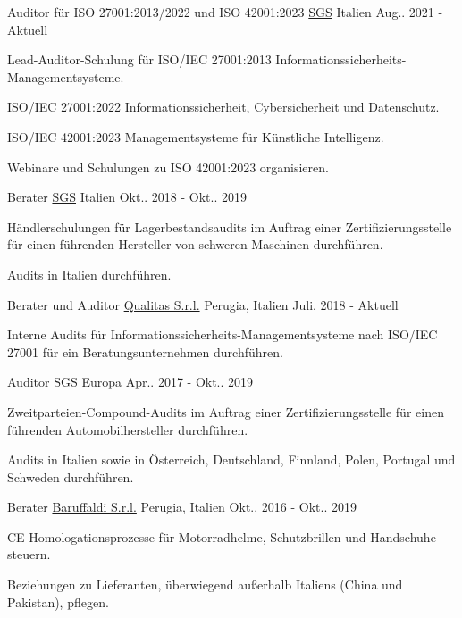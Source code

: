 \begin{cventries}
\cventry
{Auditor für ISO 27001:2013/2022 und ISO 42001:2023}
{\href{https://sgs.com}{SGS}}
{Italien}
{Aug.. 2021 - Aktuell}
{\begin{cvitems}
\item {Lead-Auditor-Schulung für ISO/IEC 27001:2013 Informationssicherheits-Managementsysteme.}
\item {ISO/IEC 27001:2022 Informationssicherheit, Cybersicherheit und Datenschutz.}
\item {ISO/IEC 42001:2023 Managementsysteme für Künstliche Intelligenz.}
\item {Webinare und Schulungen zu ISO 42001:2023 organisieren.}
\end{cvitems}}

\cventry
{Berater}
{\href{https://sgs.com}{SGS}}
{Italien}
{Okt.. 2018 - Okt.. 2019}
{\begin{cvitems}
\item {Händlerschulungen für Lagerbestandsaudits im Auftrag einer Zertifizierungsstelle für einen führenden Hersteller von schweren Maschinen durchführen.}
\item {Audits in Italien durchführen.}
\end{cvitems}}

\cventry
{Berater und Auditor}
{\href{https://www.qualitas.eu}{Qualitas S.r.l.}}
{Perugia, Italien}
{Juli. 2018 - Aktuell}
{\begin{cvitems}
\item {Interne Audits für Informationssicherheits-Managementsysteme nach ISO/IEC 27001 für ein Beratungsunternehmen durchführen.}
\end{cvitems}}

\cventry
{Auditor}
{\href{https://sgs.com}{SGS}}
{Europa}
{Apr.. 2017 - Okt.. 2019}
{\begin{cvitems}
\item {Zweitparteien-Compound-Audits im Auftrag einer Zertifizierungsstelle für einen führenden Automobilhersteller durchführen.}
\item {Audits in Italien sowie in Österreich, Deutschland, Finnland, Polen, Portugal und Schweden durchführen.}
\end{cvitems}}

\cventry
{Berater}
{\href{https://www.baruffaldi.net/}{Baruffaldi S.r.l.}}
{Perugia, Italien}
{Okt.. 2016 - Okt.. 2019}
{\begin{cvitems}
\item {CE-Homologationsprozesse für Motorradhelme, Schutzbrillen und Handschuhe steuern.}
\item {Beziehungen zu Lieferanten, überwiegend außerhalb Italiens (China und Pakistan), pflegen.}
\end{cvitems}}

\end{cventries}